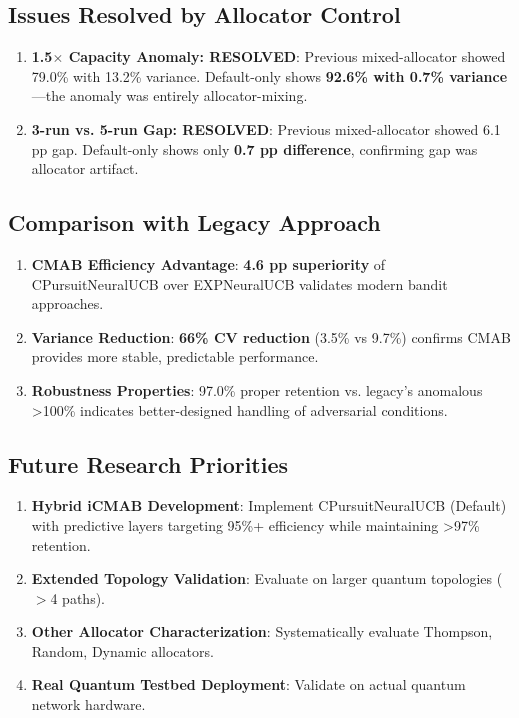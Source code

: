 \documentclass[12pt,a4paper]{article}
\newcommand{\success}[1]{\textcolor{accentgreen}{\textbf{#1}}}
\begin{document}
\subsection{Issues Resolved by Allocator Control}

\begin{enumerate}
    \item \success{1.5$\times$ Capacity Anomaly: RESOLVED}: Previous mixed-allocator showed 79.0\% with 13.2\% variance. Default-only shows \success{92.6\% with 0.7\% variance}—the anomaly was entirely allocator-mixing.
    
    \item \success{3-run vs. 5-run Gap: RESOLVED}: Previous mixed-allocator showed 6.1 pp gap. Default-only shows only \success{0.7 pp difference}, confirming gap was allocator artifact.
\end{enumerate}

\subsection{Comparison with Legacy Approach}

\begin{enumerate}
    \item \success{CMAB Efficiency Advantage}: \success{4.6 pp superiority} of CPursuitNeuralUCB over EXPNeuralUCB validates modern bandit approaches.
    
    \item \success{Variance Reduction}: \success{66\% CV reduction} (3.5\% vs 9.7\%) confirms CMAB provides more stable, predictable performance.
    
    \item \success{Robustness Properties}: 97.0\% proper retention vs. legacy's anomalous >100\% indicates better-designed handling of adversarial conditions.
\end{enumerate}

\subsection{Future Research Priorities}

\begin{enumerate}
    \item \textbf{Hybrid iCMAB Development}: Implement CPursuitNeuralUCB (Default) with predictive layers targeting 95\%+ efficiency while maintaining >97\% retention.
    \item \textbf{Extended Topology Validation}: Evaluate on larger quantum topologies ($>$4 paths).
    \item \textbf{Other Allocator Characterization}: Systematically evaluate Thompson, Random, Dynamic allocators.
    \item \textbf{Real Quantum Testbed Deployment}: Validate on actual quantum network hardware.
\end{enumerate}
\end{document}
